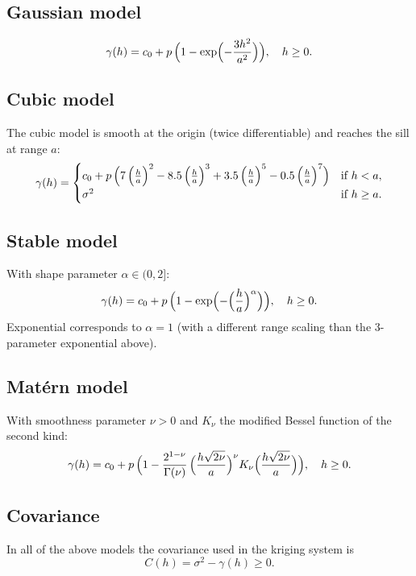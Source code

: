 \documentclass[11pt]{article}
\begin{document}
\subsection{Gaussian model}
\begin{equation}
  \gamma(h) = c_0 + p\,\Bigl(1 - \exp\Bigl(-\frac{3h^2}{a^2}\Bigr)\Bigr), \quad h \ge 0.
\end{equation}

\subsection{Cubic model}
The cubic model is smooth at the origin (twice differentiable) and reaches the sill at range $a$:
\begin{equation}
  \gamma(h) =
  \begin{cases}
    c_0 + p\,\Bigl(7\,\Bigl(\frac{h}{a}\Bigr)^2 - 8.5\,\Bigl(\frac{h}{a}\Bigr)^3 + 3.5\,\Bigl(\frac{h}{a}\Bigr)^5 - 0.5\,\Bigl(\frac{h}{a}\Bigr)^7\Bigr) & \text{if } h < a, \\
    \sigma^2 & \text{if } h \ge a.
  \end{cases}
\end{equation}

\subsection{Stable model}
With shape parameter $\alpha \in (0, 2]$:
\begin{equation}
  \gamma(h) = c_0 + p\,\Bigl(1 - \exp\Bigl(-\Bigl(\frac{h}{a}\Bigr)^\alpha\Bigr)\Bigr), \quad h \ge 0.
\end{equation}
Exponential corresponds to $\alpha = 1$ (with a different range scaling than the 3-parameter exponential above).

\subsection{Matérn model}
With smoothness parameter $\nu > 0$ and $K_\nu$ the modified Bessel function of the second kind:
\begin{equation}
  \gamma(h) = c_0 + p\,\Bigl(1 - \frac{2^{1-\nu}}{\Gamma(\nu)}\,\Bigl(\frac{h\sqrt{2\nu}}{a}\Bigr)^\nu K_\nu\Bigl(\frac{h\sqrt{2\nu}}{a}\Bigr)\Bigr), \quad h \ge 0.
\end{equation}

\subsection{Covariance}
In all of the above models the covariance used in the kriging system is
\begin{equation}
  C(h) = \sigma^2 - \gamma(h) \ge 0.
\end{equation}
\end{document}
